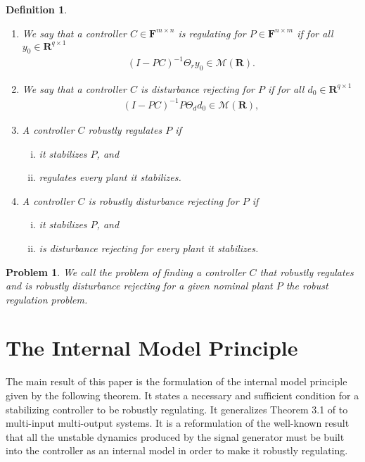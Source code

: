 \documentclass[11pt, a4paper]{amsart}
\newcommand{\inv}{^{-1}}
\newtheorem{problem}{Problem}
\newtheorem{defin}{Definition}
\newcommand{\matrices}[1]{\mathcal{M}\left( #1 \right)}		%
\newcommand{\measurement}{y}								%
\newcommand{\disturbance}{d}								%
\newcommand{\Plant}{P}										%
\newcommand{\Cont}{C}										%
\newcommand{\Gen}{\Theta}									%
\newcommand{\stable}{\mathbf{R}}							%
\newcommand{\fractions}[1]{\mathbf{F}} %
\begin{document}
\begin{defin}
\begin{enumerate}
\item We say that a controller $\Cont\in\fractions{\stable}^{m\times n}$ is \emph{regulating} for $\Plant\in\fractions{\stable}^{n\times m}$ if for all $\measurement_0\in\stable^{q\times 1}$
\begin{align*}
\left(I-\Plant\Cont\right)\inv \Gen_r\measurement_0\in \matrices{\stable}.
\end{align*}

\item We say that a controller $\Cont$ is \emph{disturbance rejecting} for $\Plant$ if for all $\disturbance_0\in\stable^{q\times 1}$
\begin{align*}
\left(I-\Plant\Cont\right)\inv \Plant \Gen_d\disturbance_0\in \matrices{\stable},
\end{align*}
\item A controller $\Cont$ \emph{robustly regulates} $\Plant$ if 
\begin{enumerate}[i)]
\item it stabilizes $\Plant$, and
\item regulates every plant it stabilizes.
\end{enumerate}
\item A controller $\Cont$ is \emph{robustly disturbance rejecting} for $\Plant$ if 
\begin{enumerate}[i)]
\item it stabilizes $\Plant$, and
\item is disturbance rejecting for every plant it stabilizes.
\end{enumerate}
\end{enumerate}
\end{defin}

\begin{problem}
We call the problem of finding a controller $\Cont$ that robustly regulates and is robustly disturbance rejecting for a given nominal plant $\Plant$ \emph{the robust regulation problem.}
\end{problem}

\section{The Internal Model Principle}\label{sec:IMP}

The main result of this paper is the formulation of the internal model principle given by the following theorem. It states a necessary and sufficient condition for a stabilizing controller to be robustly regulating. It generalizes Theorem 3.1 of \cite{LaakkonenQuadrat2015} to multi-input multi-output systems. It is a reformulation of the well-known result that all the unstable dynamics produced by the signal generator must be built into the controller as an internal model in order to make it robustly regulating.
\end{document}
